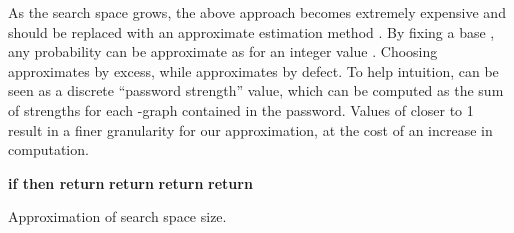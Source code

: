 \documentclass[a4paper,twocolumn]{article}
\newenvironment{lyxcode}
{\par\begin{list}{}{
\setlength{\rightmargin}{\leftmargin}
\setlength{\listparindent}{0pt}\raggedright
\setlength{\itemsep}{0pt}
\setlength{\parsep}{0pt}
\normalfont\ttfamily}\item[]}
{\end{list}}
\begin{document}
As the search space grows, the above approach becomes extremely expensive
and should be replaced with an approximate estimation method \cite{Narayanan2005Fast}.
By fixing a base , any probability  can be approximate as
 for an integer value . Choosing 
approximates  by excess, while 
approximates by defect. To help intuition,  can be seen as a discrete
{}``password strength'' value, which can be computed as the sum
of strengths for each -graph contained in the password. Values
of  closer to 1 result in a finer granularity for our approximation,
at the cost of an increase in computation.

\begin{algorithm}
\begin{algorithmic}
\State {}
\State \textbf{if  then return }
\State 
\ForAll{}
\State 
\If{}
\State{}
\EndIf
\EndFor
\State \textbf{return} 
\EndFunction
\State
{}
\State {}
\If{}
\State 
\EndIf
\State \textbf{return} 
\EndFunction
\State
{} 
\State \textbf{return} 
\EndFunction
\end{algorithmic}

\begin{comment}
\begin{lyxcode}
def~approxsize(state,~length,~l):

~~~~if~length~==~0:

~~~~~~~~return~1

~~~~s~=~0

~~~~for~c~in~chars:

~~~~~~~~newl~=~l~-~floor(-log(nu(state~+~c,

~~~~~~~~~~~~~~~~~~~~~~~~~~~~~~~~~state),~b))

~~~~~~~~if~newl~>=~0:

~~~~~~~~~~~~s~+=~approxsize(state{[}1:{]}~+~c,

~~~~~~~~~~~~~~~~~~~~~~~~~~~~length~-~1,

~~~~~~~~~~~~~~~~~~~~~~~~~~~~newl)

~~~~return~s
\end{lyxcode}

\end{comment}
{}

\caption{\label{alg:Implicit-approximation-of}Approximation of search space
size.}

\end{algorithm}
\end{document}
